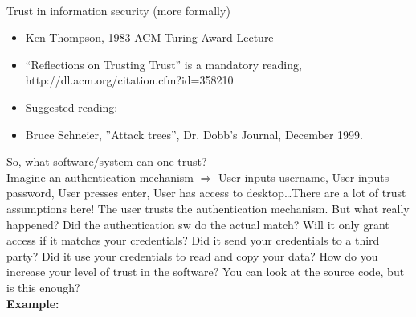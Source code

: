 \\Trust in information security (more formally)
\begin{itemize}
    \item Ken Thompson, 1983 ACM Turing Award Lecture
    \item “Reflections on Trusting Trust” is a mandatory reading, http://dl.acm.org/citation.cfm?id=358210
    \item Suggested reading:
    \item Bruce Schneier, ”Attack trees”, Dr. Dobb's Journal, December 1999.
\end{itemize}
So, what software/system can one trust?
\\Imagine an authentication mechanism $\Rightarrow$ User inputs username, User inputs password, User presses enter, User has access to desktop…There are a lot of trust assumptions here!
The user trusts the authentication mechanism. But what really happened? Did the authentication sw do the actual match? Will it only grant access if it matches your credentials? Did it send your credentials to a third party? Did it use your credentials to read and copy your data?
How do you increase your level of trust in the software? You can look at the source code, but is this enough?
\\\textbf{Example:}

